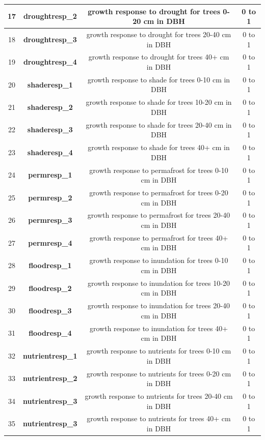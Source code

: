 \documentclass[a4paper, 12pt] {article}
\begin{document}
\begin{table} [H]
{\begin{tabular}{|c|c|c|c|}
\hline 
17 & \textbf{droughtresp\_2} & growth response to drought for trees 0-20 cm in DBH & 0 to 1 \\
\hline 
18 & \textbf{droughtresp\_3} & growth response to drought for trees 20-40 cm in DBH & 0 to 1 \\
\hline 
19 & \textbf{droughtresp\_4} & growth response to drought for trees 40+ cm in DBH & 0 to 1 \\
\hline 
20 & \textbf{shaderesp\_1} & growth response to shade for trees 0-10 cm in DBH & 0 to 1 \\
\hline 
21 & \textbf{shaderesp\_2} & growth response to shade for trees 10-20 cm in DBH & 0 to 1 \\
\hline 
22 & \textbf{shaderesp\_3} & growth response to shade for trees 20-40 cm in DBH & 0 to 1 \\
\hline 
23 & \textbf{shaderesp\_4} & growth response to shade for trees 40+ cm in DBH & 0 to 1 \\
\hline 
24 & \textbf{permresp\_1} & growth response to permafrost for trees 0-10 cm in DBH & 0 to 1 \\
\hline 
25 & \textbf{permresp\_2} & growth response to permafrost for trees 0-20 cm in DBH & 0 to 1 \\
\hline 
26 & \textbf{permresp\_3} & growth response to permafrost for trees 20-40 cm in DBH & 0 to 1 \\
\hline 
27 & \textbf{permresp\_4} & growth response to permafrost for trees 40+ cm in DBH & 0 to 1 \\
\hline 
28 & \textbf{floodresp\_1} & growth response to inundation for trees 0-10 cm in DBH & 0 to 1 \\
\hline 
29 & \textbf{floodresp\_2} & growth response to inundation for trees 10-20 cm in DBH & 0 to 1 \\
\hline 
30 & \textbf{floodresp\_3} & growth response to inundation for trees 20-40 cm in DBH & 0 to 1 \\
\hline 
31 & \textbf{floodresp\_4} & growth response to inundation for trees 40+ cm in DBH & 0 to 1 \\
\hline 
32 & \textbf{nutrientresp\_1} & growth response to nutrients for trees 0-10 cm in DBH & 0 to 1 \\
\hline 
33 & \textbf{nutrientresp\_2} & growth response to nutrients for trees 0-20 cm in DBH & 0 to 1 \\
\hline 
34 & \textbf{nutrientresp\_3} & growth response to nutrients for trees 20-40 cm in DBH & 0 to 1 \\
\hline 
35 & \textbf{nutrientresp\_3} & growth response to nutrients for trees 40+ cm in DBH & 0 to 1 \\

\end{tabular}}
\end{table}
\end{document}
